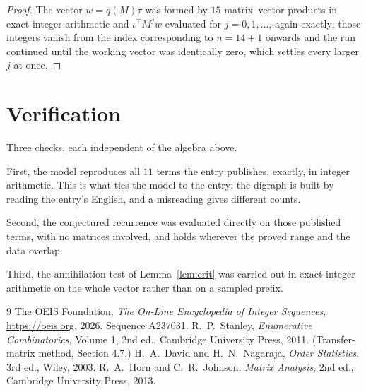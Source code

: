 \documentclass[11pt,a4paper]{article}
\theoremstyle{plain}
\theoremstyle{definition}
\begin{document}
\begin{proof}
The vector $w=q(M)\tau$ was formed by $15$ matrix--vector products in exact integer
arithmetic and $\iota^{\!\top}M^{j}w$ evaluated for $j=0,1,\dots$, again exactly; those
integers vanish from the index corresponding to $n=14+1$ onwards and the run continued
until the working vector was identically zero, which settles every larger $j$ at once.
\end{proof}

\section{Verification}

Three checks, each independent of the algebra above.

First, the model reproduces all $11$ terms the entry publishes, exactly, in integer
arithmetic. This is what ties the model to the entry: the digraph is built by reading the
entry's English, and a misreading gives different counts.

Second, the conjectured recurrence was evaluated directly on those published terms, with no
matrices involved, and holds wherever the proved range and the data overlap.

Third, the annihilation test of Lemma~\ref{lem:crit} was carried out in exact integer
arithmetic on the whole vector rather than on a sampled prefix.

\begin{thebibliography}{9}
 The OEIS Foundation, \emph{The On-Line Encyclopedia of Integer
Sequences}, \url{https://oeis.org}, 2026. Sequence A237031.
 R.~P.~Stanley, \emph{Enumerative Combinatorics}, Volume 1, 2nd ed.,
Cambridge University Press, 2011. (Transfer-matrix method, Section 4.7.)
 H.~A.~David and H.~N.~Nagaraja, \emph{Order Statistics}, 3rd ed., Wiley,
2003.
 R.~A.~Horn and C.~R.~Johnson, \emph{Matrix Analysis}, 2nd ed., Cambridge
University Press, 2013.
\end{thebibliography}
\end{document}
